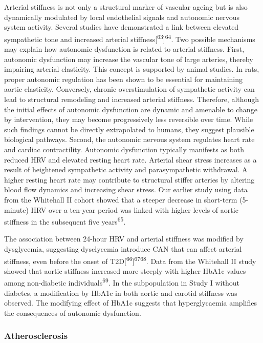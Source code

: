 \documentclass[
  a4paper,
  headsepline=true,
  open=any]{scrbook}
\begin{document}
Arterial stiffness is not only a structural marker of vascular ageing
but is also dynamically modulated by local endothelial signals and
autonomic nervous system activity. Several studies have demonstrated a
link between elevated sympathetic tone and increased arterial
stiffness{[}\textsuperscript{63}{]}\textsuperscript{64}. Two possible
mechanisms may explain how autonomic dysfunction is related to arterial
stiffness. First, autonomic dysfunction may increase the vascular tone
of large arteries, thereby impairing arterial elasticity. This concept
is supported by animal studies. In rats, proper autonomic regulation has
been shown to be essential for maintaining aortic elasticity.
Conversely, chronic overstimulation of sympathetic activity can lead to
structural remodeling and increased arterial stiffness. Therefore,
although the initial effects of autonomic dysfunction are dynamic and
amenable to change by intervention, they may become progressively less
reversible over time. While such findings cannot be directly
extrapolated to humans, they suggest plausible biological pathways.
Second, the autonomic nervous system regulates heart rate and cardiac
contractility. Autonomic dysfunction typically manifests as both reduced
HRV and elevated resting heart rate. Arterial shear stress increases as
a result of heightened sympathetic activity and parasympathetic
withdrawal. A higher resting heart rate may contribute to structural
stiffer arteries by altering blood flow dynamics and increasing shear
stress. Our earlier study using data from the Whitehall II cohort showed
that a steeper decrease in short-term (5-minute) HRV over a ten-year
period was linked with higher levels of aortic stiffness in the
subsequent five years\textsuperscript{65}.

The association between 24-hour HRV and arterial stiffness was modified
by dysglycemia, suggesting dysclycemia introduce CAN that can affect
arterial stiffness, even before the onset of
T2D{[}\textsuperscript{66}{]}\textsuperscript{67}\textsuperscript{68}.
Data from the Whitehall II study showed that aortic stiffness increased
more steeply with higher HbA1c values among non-diabetic
individuals\textsuperscript{69}. In the subpopulation in Study I without
diabetes, a modification by HbA1c in both aortic and carotid stiffness
was observed. The modifying effect of HbA1c suggests that hyperglycaemia
amplifies the consequences of autonomic dysfunction.

\hypertarget{atherosclerosis-1}{%
\subsubsection{Atherosclerosis}\label{atherosclerosis-1}}
\end{document}
